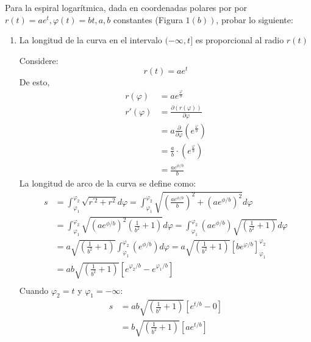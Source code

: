 \begin{problema}
     Para la espiral logarítmica, dada en coordenadas polares por por $r(t)=a e^{t}, \varphi(t)=b t, a, b$ constantes (Figura $\left.1(b)\right)$, probar lo siguiente:
\begin{enumerate}
    \item La longitud de la curva en el intervalo $(-\infty, t]$ es proporcional al radio $r(t)$
    \begin{sol}
        Considere:
        $$r(t) = ae^t$$
        De esto, 
        \begin{align*}
            r(\varphi) &=ae^{\frac{\varphi}{b}}\\
            r'(\varphi) &= \frac{\partial (r(\varphi))}{\partial \varphi  }\\
            &= a\frac{\partial }{\partial \varphi }\left(e^{\frac{\varphi}{b}}\right)\\
            &= \frac{a}{b}\cdot\left(e^{\frac{\varphi}{b}}\right)\\
            &= \frac{ae^{\phi/b}}{b}
        \end{align*}
        La longitud de arco de la curva se define como: 
        \begin{align*}
            s &= \int_{\varphi_{1}}^{\varphi_{2}} \sqrt{r^{\prime 2}+r^{2}} d \varphi= \int_{\varphi_{1}}^{\varphi_{2}} \sqrt{\left(\frac{ae^{\phi/b}}{b}\right)^{2}+\left(ae^{\phi/b}\right)^{2}} d \varphi\\
            &= \int_{\varphi_{1}}^{\varphi_{2}} \sqrt{\left(ae^{\phi/b}\right)^{2}\left(\frac{1}{b^2}+1\right)} d \varphi= \int_{\varphi_{1}}^{\varphi_{2}} \left(ae^{\phi/b}\right)\sqrt{\left(\frac{1}{b^2}+1\right)} d \varphi\\
            &= a\sqrt{\left(\frac{1}{b^2}+1\right)}\int_{\varphi_{1}}^{\varphi_{2}} \left(e^{\phi/b}\right) d \varphi= a\sqrt{\left(\frac{1}{b^2}+1\right)} \left[be^{\varphi/b}\right]_{\varphi_1}^{\varphi_2}\\
            &=ab\sqrt{\left(\frac{1}{b^2}+1\right)} \left[e^{\varphi_2/b}-e^{\varphi_1/b}\right]\\
        \end{align*}
        Cuando $\varphi_2=t$ y $\varphi_1=-\infty$:
        \begin{align*}
            s &= ab\sqrt{\left(\frac{1}{b^2}+1\right)} \left[e^{t/b}-0\right]\\
            &= b\sqrt{\left(\frac{1}{b^2}+1\right)} \left[ae^{t/b}\right]
        \end{align*}


\end{sol}
\end{enumerate}
\end{problema}
